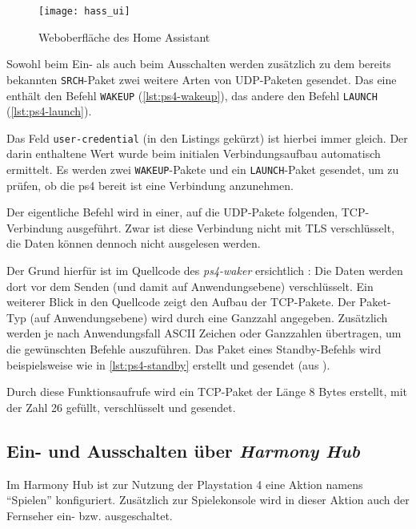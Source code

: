 \begin{figure}[h!]
    \centering
    \texttt{[image: hass\_ui]}
    \caption{Weboberfläche des Home Assistant}\label{fig:hass-ui}
\end{figure}

Sowohl beim Ein- als auch beim Ausschalten werden zusätzlich zu dem bereits bekannten \texttt{SRCH}-Paket
zwei weitere Arten von UDP-Paketen gesendet.
Das eine enthält den Befehl \texttt{WAKEUP} (\autoref{lst:ps4-wakeup}),
das andere den Befehl \texttt{LAUNCH} (\autoref{lst:ps4-launch}).




Das Feld \texttt{user-credential} (in den Listings gekürzt) ist hierbei immer gleich.
Der darin enthaltene Wert wurde beim initialen Verbindungsaufbau automatisch ermittelt.
Es werden zwei \texttt{WAKEUP}-Pakete und ein \texttt{LAUNCH}-Paket gesendet,
um zu prüfen, ob die \ac{ps4} bereit ist eine Verbindung anzunehmen.



Der eigentliche Befehl wird in einer, auf die UDP-Pakete folgenden, TCP-Verbindung ausgeführt.
Zwar ist diese Verbindung nicht mit TLS verschlüsselt,
die Daten können dennoch nicht ausgelesen werden.

Der Grund hierfür ist im Quellcode des \textit{ps4-waker} ersichtlich \cite{ps4waker31:online}\cite{ps4waker93:online}:
Die Daten werden dort vor dem Senden (und damit auf Anwendungsebene) verschlüsselt.
Ein weiterer Blick in den Quellcode zeigt den Aufbau der TCP-Pakete.
Der Paket-Typ (auf Anwendungsebene) wird durch eine Ganzzahl angegeben.
Zusätzlich werden je nach Anwendungsfall ASCII Zeichen oder Ganzzahlen übertragen,
um die gewünschten Befehle auszuführen.
Das Paket eines Standby-Befehls wird beispielsweise wie in \autoref{lst:ps4-standby} erstellt und gesendet (aus \cite{ps4waker31:online}).



Durch diese Funktionsaufrufe wird ein TCP-Paket der Länge 8 Bytes erstellt,
mit der Zahl 26 gefüllt,
verschlüsselt und gesendet.

\newpage

\subsection{Ein- und Ausschalten über \textit{Harmony Hub}}\label{sec:durchfuehrung-harmony}
Im Harmony Hub ist zur Nutzung der Playstation 4 eine Aktion namens \enquote{Spielen} konfiguriert.
Zusätzlich zur Spielekonsole wird in dieser Aktion auch der Fernseher ein- bzw. ausgeschaltet.


